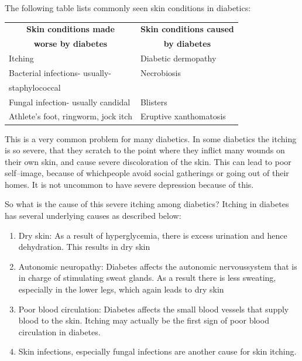 \vskip 4pt
\noindent The following table lists commonly seen skin conditions in diabetics:

\begin{center}
\begin{tabular}{|l|l|}
\hline
\multicolumn{1}{|c}{\textbf{Skin conditions made}} & \multicolumn{1}{|c|}{\textbf{Skin conditions caused}}\\
\multicolumn{1}{|c}{\textbf{worse by diabetes}} & \multicolumn{1}{|c|}{\textbf{by diabetes}}\\
\hline
Itching & Diabetic dermopathy\\
\hline
Bacterial infections- usually- & Necrobiosis\\
staphylococcal & \\
\hline
Fungal infection- usually candidal & Blisters\\
\hline
Athlete’s foot, ringworm, jock itch & Eruptive xanthomatosis\\
\hline
\end{tabular}
\end{center}


This is a very common problem for many diabetics. In some dia\-betics the itching is so severe, that they scratch to the point where they inflict many wounds on their own skin, and cause severe dis\-coloration of the skin. This can lead to poor self–image, because of which\break people avoid social gatherings or going out of their homes. It is not un\-common to have severe depression because of this.

So what is the cause of this severe itching among diabetics? Itching in diabetes has several underlying causes as described below:

\vspace{-\topsep}
\begin{enumerate}[•]
\itemsep=0pt
\item Dry skin: As a result of hyperglycemia, there is excess urination and hence dehydration. This results in dry skin
\item Autonomic neuropathy: Diabetes affects the autonomic nervous\break system that is in charge of stimulating sweat glands. As a result there is less sweating, especially in the lower legs, which again leads to dry skin
\item Poor blood circulation: Diabetes affects the small blood vessels that supply blood to the skin. Itching may actually be the first sign of poor blood circulation in diabetes.
\item Skin infections, especially fungal infections are another cause for skin itching.
\end{enumerate}
\vspace{-\topsep}

